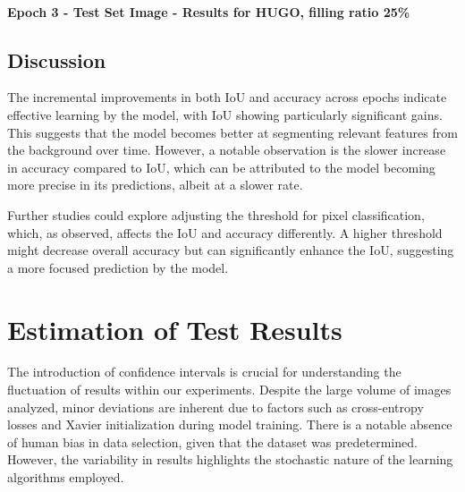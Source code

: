 \documentclass[12pt,a4paper]{article}
\begin{document}
{\paragraph{Epoch 3 - Test Set Image - Results for HUGO, filling ratio 25\%}
}

\captionsetup{skip=10pt}

\subsection{Discussion}

The incremental improvements in both IoU and accuracy across epochs indicate effective learning by the model, with IoU showing particularly significant gains. This suggests that the model becomes better at segmenting relevant features from the background over time. However, a notable observation is the slower increase in accuracy compared to IoU, which can be attributed to the model becoming more precise in its predictions, albeit at a slower rate.

Further studies could explore adjusting the threshold for pixel classification, which, as observed, affects the IoU and accuracy differently. A higher threshold might decrease overall accuracy but can significantly enhance the IoU, suggesting a more focused prediction by the model.

\section{Estimation of Test Results}

The introduction of confidence intervals is crucial for understanding the fluctuation of results within our experiments. Despite the large volume of images analyzed, minor deviations are inherent due to factors such as cross-entropy losses and Xavier initialization during model training. There is a notable absence of human bias in data selection, given that the dataset was predetermined. However, the variability in results highlights the stochastic nature of the learning algorithms employed.
\end{document}
